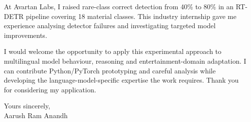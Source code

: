 \documentclass[11pt,a4paper]{article}
\begin{document}
At Avartan Labs, I raised rare-class correct detection from 40\% to 80\% in an RT-DETR pipeline covering 18 material classes. This industry internship gave me experience analysing detector failures and investigating targeted model improvements.\par\vspace{10pt}
I would welcome the opportunity to apply this experimental approach to multilingual model behaviour, reasoning and entertainment-domain adaptation. I can contribute Python/PyTorch prototyping and careful analysis while developing the language-model-specific expertise the work requires. Thank you for considering my application.\par\vspace{14pt}
Yours sincerely,\\[5pt]
Aarush Ram Anandh
\end{document}
